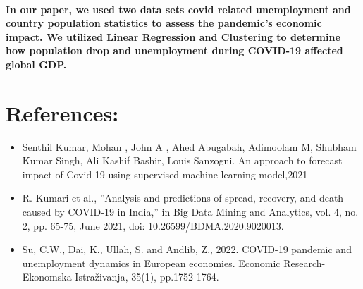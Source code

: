 \documentclass{article}
\begin{document}
\paragraph{ In our paper, we used two data sets covid related unemployment 
and country population statistics to assess the pandemic’s economic impact. 
We utilized Linear Regression and Clustering to determine how population drop 
and unemployment during COVID-19 affected global GDP.
}

\section{References:}

\begin{itemize}
  \item Senthil Kumar, Mohan , John A , Ahed Abugabah, Adimoolam M,
Shubham Kumar Singh, Ali Kashif Bashir, Louis Sanzogni. An approach
to forecast impact of Covid-19 using supervised machine learning
model,2021
  \item R. Kumari et al., ”Analysis and predictions of spread, recovery, and
death caused by COVID-19 in India,” in Big Data Mining and Analytics,
vol. 4, no. 2, pp. 65-75, June 2021, doi: 10.26599/BDMA.2020.9020013.
  \item Su, C.W., Dai, K., Ullah, S. and Andlib, Z., 2022. COVID-19 pandemic and unemployment dynamics in European economies. Economic Research-Ekonomska Istraživanja, 35(1), pp.1752-1764.
\end{itemize}
\end{document}
